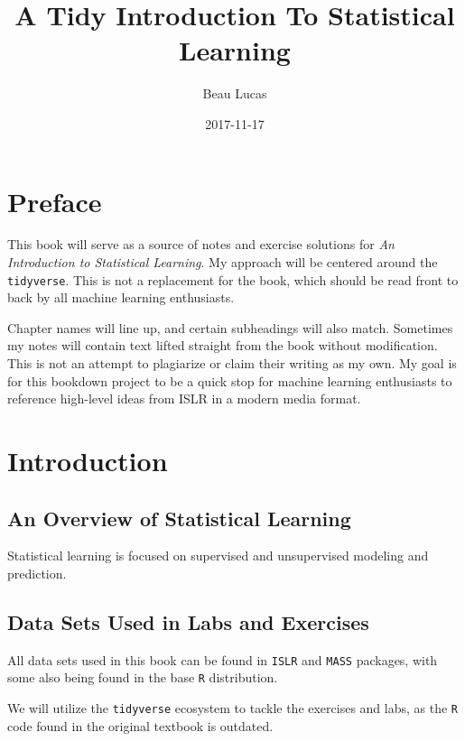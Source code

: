\documentclass[]{book}
\title{A Tidy Introduction To Statistical Learning}
\author{Beau Lucas}
\date{2017-11-17}
\theoremstyle{definition}
\theoremstyle{definition}
\theoremstyle{definition}
\theoremstyle{remark}
\begin{document}
\maketitle

{
\setcounter{tocdepth}{1}
\tableofcontents
}
\chapter*{Preface}\label{preface}

This book will serve as a source of notes and exercise solutions for
\emph{An Introduction to Statistical Learning}. My approach will be
centered around the \texttt{tidyverse}. This is not a replacement for
the book, which should be read front to back by all machine learning
enthusiasts.

Chapter names will line up, and certain subheadings will also match.
Sometimes my notes will contain text lifted straight from the book
without modification. This is not an attempt to plagiarize or claim
their writing as my own. My goal is for this bookdown project to be a
quick stop for machine learning enthusiasts to reference high-level
ideas from ISLR in a modern media format.

\chapter{Introduction}\label{intro}

\section{An Overview of Statistical
Learning}\label{an-overview-of-statistical-learning}

Statistical learning is focused on supervised and unsupervised modeling
and prediction.

\section{Data Sets Used in Labs and
Exercises}\label{data-sets-used-in-labs-and-exercises}

All data sets used in this book can be found in \texttt{ISLR} and
\texttt{MASS} packages, with some also being found in the base
\texttt{R} distribution.

We will utilize the \texttt{tidyverse} ecosystem to tackle the exercises
and labs, as the \texttt{R} code found in the original textbook is
outdated.
\end{document}
